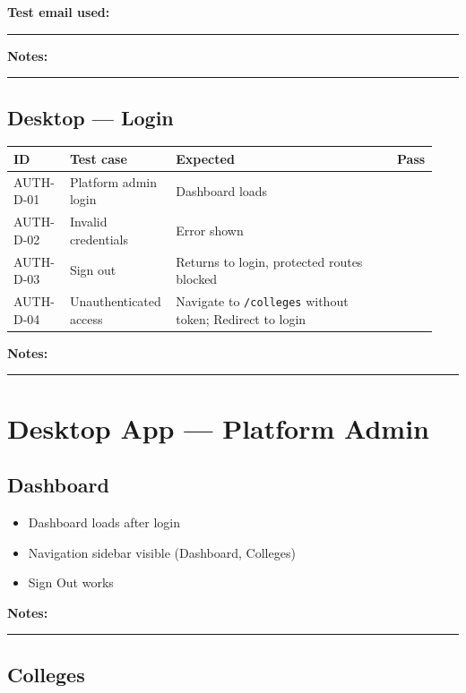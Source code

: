 \documentclass[11pt,a4paper,oneside]{article}
\newcommand{\chk}{\fbox{\rule{0pt}{1.05ex}\rule{1.05ex}{0pt}}}
\newcommand{\fillin}[1][3.5cm]{\rule{#1}{0.4pt}}
\newcommand{\fillinlong}{\rule{0.72\textwidth}{0.4pt}}
\newcommand{\notesblock}{\par\smallskip\noindent\textbf{Notes:}\ \fillinlong\par\smallskip}
\newcommand{\fieldline}[1]{\par\smallskip\noindent\textbf{#1}\ \fillin\par}
\newcommand{\tcheadfour}{%
  \toprule
  \textbf{ID} & \textbf{Test case} & \textbf{Expected} & \textbf{Pass} \\
  \midrule
}
\begin{document}
\fieldline{Test email used:}
\notesblock

\subsection{Desktop — Login}

\small
\begin{tabular}{@{}>{\raggedright\arraybackslash}p{0.13\linewidth} >{\raggedright\arraybackslash}p{0.24\linewidth} >{\raggedright\arraybackslash}p{0.51\linewidth} >{\centering\arraybackslash}p{0.06\linewidth}@{}}
  \tcheadfour
  AUTH-D-01 & Platform admin login       & Dashboard loads                              & \chk \\
  AUTH-D-02 & Invalid credentials        & Error shown                                  & \chk \\
  AUTH-D-03 & Sign out                   & Returns to login, protected routes blocked   & \chk \\
  AUTH-D-04 & Unauthenticated access & Navigate to \texttt{/colleges} without token; Redirect to login & \chk \\
  \bottomrule
\end{tabular}
\normalsize

\notesblock

\section{Desktop App — Platform Admin}

\subsection{Dashboard}

\begin{itemize}[leftmargin=2em, itemsep=0.25em]
  \item[\chk] Dashboard loads after login
  \item[\chk] Navigation sidebar visible (Dashboard, Colleges)
  \item[\chk] Sign Out works
\end{itemize}

\notesblock

\subsection{Colleges}
\end{document}
